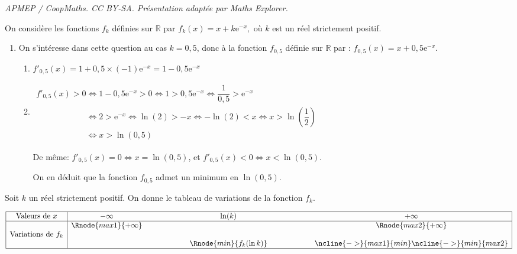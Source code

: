 \documentclass[10pt]{article}
\providecommand{\R}{\mathbb{R}}
\providecommand{\e}{{\mathrm{e}}}
\begin{document}
\noindent\textit{APMEP / CoopMaths. CC BY-SA. Présentation adaptée par Maths Explorer.}\par\medskip
On considère les fonctions $f_{k}$ définies sur $\R$ par 
$f_{k}(x) = x + k \e^{-x},$
 où $k$ est un réel strictement positif.

	\begin{enumerate}
		\item On s'intéresse dans cette question au cas $k = 0,5$, donc à la fonction $f_{0,5}$ définie sur $\R$ par : $f_{0,5}(x) = x + 0,5 \e^{-x}.$

\smallskip
	\begin{enumerate}
		\item 
$f'_{0,5}(x)=1+0,5\times(-1)\e^{-x}=1-0,5\e^{-x}$		
		
		\item 
$\begin{gathered}f'_{0,5}(x) >0
\iff
1-0,5\e^{-x} >0
\iff
1>0,5\e^{-x}
\iff
\dfrac{1}{0,5}>\e^{-x}\\
\phantom{f'_{0,5}(x) >0}
\iff
2>\e^{-x}
\iff
\ln(2)>-x
\iff
-\ln(2)<x
\iff
x>\ln\left (\dfrac{1}{2}\right )\\
\phantom{f'_{0,5}(x) >0}
\iff
x>\ln(0,5)\end{gathered}$

De même: $f'_{0,5}(x)=0 \iff x=\ln(0,5)$, et $f'_{0,5}(x)<0 \iff x<\ln(0,5)$.

On en déduit que la fonction $f_{0,5}$ admet un minimum en $\ln(0,5)$.
	\end{enumerate}
\end{enumerate}

Soit $k$ un réel strictement positif. On donne le tableau de variations de la fonction $f_{k}$.
\medskip

\begin{center}
{\renewcommand{\arraystretch}{1.3}
\def\esp{\hspace*{1.5cm}}
\def\hauteur{0pt}
$\begin{array}{|c| *4{c} c|}
\hline
 \text{Valeurs de } x & -\infty & \esp & \ln(k) & \esp & +\infty \\
\hline
  & \Rnode{max1}{+\infty}  &  &  &  & \Rnode{max2}{+\infty}   \\
\text{Variations de } f_k & &  & & &  \rule{0pt}{\hauteur} \\
 &  & &   \Rnode{min}{f_k(\ln k)} & & \rule{0pt}{\hauteur}
\ncline{->}{max1}{min} \ncline{->}{min}{max2}\\
\hline
\end{array}$
\renewcommand{\arraystretch}{1}}
\end{center}
\end{document}
